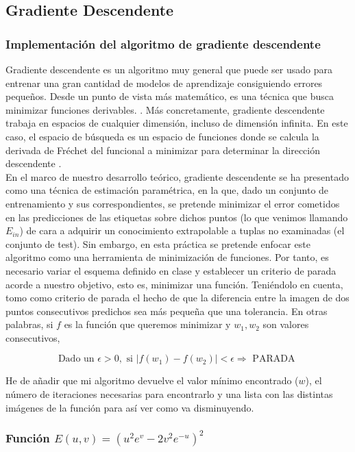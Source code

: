 \subsection{Gradiente Descendente}

\subsubsection{Implementación del algoritmo de gradiente descendente}

Gradiente descendente es un algoritmo muy general que puede ser usado para entrenar una gran cantidad de modelos de aprendizaje consiguiendo errores pequeños. Desde un punto de vista más matemático, es una técnica que busca minimizar funciones derivables. \cite{lfd}. Más concretamente, gradiente descendente trabaja en espacios de cualquier dimensión, incluso de dimensión infinita. En este caso, el espacio de búsqueda es un espacio de funciones donde se calcula la derivada de Fréchet del funcional a minimizar para determinar la dirección descendente \cite{funtional_analysis}. \\

En el marco de nuestro desarrollo teórico, gradiente descendente se ha presentado como una técnica de estimación paramétrica, en la que, dado un conjunto de entrenamiento y sus correspondientes, se pretende minimizar el error cometidos en las predicciones de las etiquetas sobre dichos puntos (lo que venimos llamando $E_{in}$) de cara a adquirir un conocimiento extrapolable a tuplas no examinadas (el conjunto de test). Sin embargo, en esta práctica se pretende enfocar este algoritmo como una herramienta de minimización de funciones. Por tanto, es necesario variar el esquema definido en clase y establecer un criterio de parada acorde a nuestro objetivo, esto es, minimizar una función. Teniéndolo en cuenta, tomo como criterio de parada el hecho de que la diferencia entre la imagen de dos puntos consecutivos predichos sea más pequeña que una tolerancia. En otras palabras, si $f$ es la función que queremos minimizar y $w_1,w_2$ son valores consecutivos,

$$\text{Dado un } \epsilon > 0, \text{ si } |f(w_1)-f(w_2)| < \epsilon \Rightarrow \text{ PARADA }$$


He de añadir que mi algoritmo devuelve el valor mínimo encontrado ($w$), el número de iteraciones necesarias para encontrarlo y una lista con las distintas imágenes de la función para así ver como va disminuyendo.

\subsubsection{Función $E(u,v) = (u^2e^v-2v^2e^{-u})^2$}

